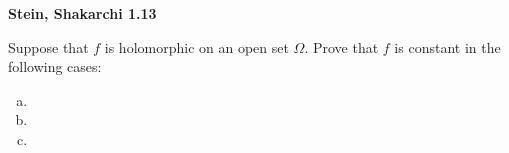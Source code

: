 \textbf{Stein, Shakarchi 1.13}

Suppose that $f$ is holomorphic on an open set $\Omega$. Prove that $f$ is constant in the following cases:

\begin{enumerate}[(a)]
    \item 
    \item 
    \item 
\end{enumerate}